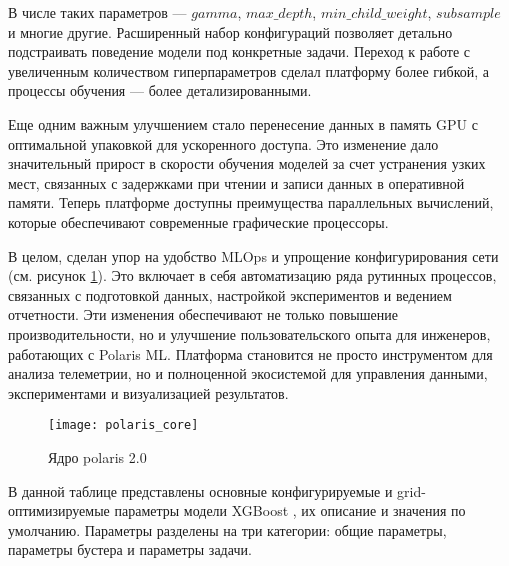 В числе таких параметров — $gamma$, $max\_depth$, $min\_child\_weight$, $subsample$ и многие другие. Расширенный набор конфигураций позволяет детально подстраивать поведение модели под конкретные задачи. Переход к работе с увеличенным количеством гиперпараметров сделал платформу более гибкой, а процессы обучения — более детализированными.

Еще одним важным улучшением стало перенесение данных в память GPU с оптимальной упаковкой для ускоренного доступа. Это изменение дало значительный прирост в скорости обучения моделей за счет устранения узких мест, связанных с задержками при чтении и записи данных в оперативной памяти. Теперь платформе доступны преимущества параллельных вычислений, которые обеспечивают современные графические процессоры.

В целом, сделан упор на удобство MLOps и упрощение конфигурирования сети (см. рисунок \ref{fig:polaris_core}). Это включает в себя автоматизацию ряда рутинных процессов, связанных с подготовкой данных, настройкой экспериментов и ведением отчетности. Эти изменения обеспечивают не только повышение производительности, но и улучшение пользовательского опыта для инженеров, работающих с Polaris ML. Платформа становится не просто инструментом для анализа телеметрии, но и полноценной экосистемой для управления данными, экспериментами и визуализацией результатов.

\begin{figure}[H]
	\centering
	\texttt{[image: polaris\_core]}
	\caption{Ядро polaris 2.0}
	\label{fig:polaris_core}
\end{figure}

В данной таблице представлены основные конфигурируемые и grid-оптимизируемые параметры модели XGBoost \cite{xgboost_parameters_docs}, их описание и значения по умолчанию. Параметры разделены на три категории: общие параметры, параметры бустера и параметры задачи.

